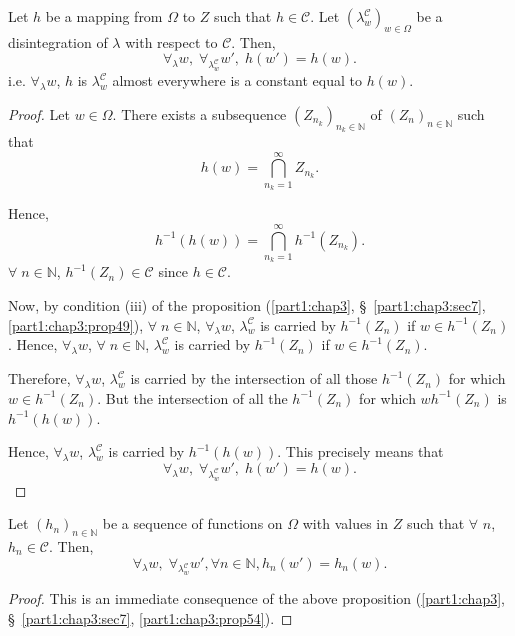 \begin{proposition}\label{part1:chap3:prop54}
Let $h$ be a mapping from $\Omega$ to $Z$ such that $h \in
\mathscr{C}$. Let $(\lambda^\mathscr{C}_w)_{w \in \Omega}$ be a
disintegration of $\lambda$ with respect to $\mathscr{C}$. Then, 
$$
\forall_\lambda w, \; \forall_{\lambda^\mathscr{C}_w} w', \; h(w') = h (w).
$$\pageoriginale
i.e. $\forall_\lambda w$, $h$ is $\lambda^\mathscr{C}_w$ almost
everywhere is a constant equal to $h(w)$. 
\end{proposition}

\begin{proof}
Let $w \in \Omega$. There exists a subsequence $(Z_{n_k})_{n_k \in
  \mathbb{N}}$ of $(Z_n)_{n \in \mathbb{N}}$ such that 
$$
h(w) = \bigcap\limits^{\infty}_{n_k =1} Z_{n_k}. 
$$

Hence, 
$$
h^{-1} (h(w)) = \bigcap\limits^{\infty}_{n_k =1} h^{-1}(Z_{n_k}). 
$$
$\forall \; n \in \mathbb{N}$, $h^{-1}(Z_n) \in \mathscr{C}$ since $h
\in \mathscr{C}$. 

Now, by condition (iii) of the proposition (\ref{part1:chap3},
\S\ \ref{part1:chap3:sec7}, \ref{part1:chap3:prop49}), $\forall 
\; n \in \mathbb{N} $, $\forall_\lambda w$, $\lambda^\mathscr{C}_w$ is
carried by $h^{-1}(Z_n)$ if $w \in h^{-1} (Z_n)$. Hence,
$\forall_\lambda w$, $\forall \; n \in \mathbb{N}$,
$\lambda^\mathscr{C}_w$ is carried by $h^{-1}(Z_n)$ if $w \in
h^{-1}(Z_n)$. 

Therefore, $\forall_\lambda w$, $\lambda^\mathscr{C}_w$ is carried by
the intersection of all those $h^{-1}(Z_n)$ for which $w \in
h^{-1}(Z_n)$. But the intersection of all the $h^{-1}(Z_n)$ for which
$w h^{-1} (Z_n)$ is $h^{-1}(h(w))$. 

Hence, $\forall_\lambda w$, $\lambda^\mathscr{C}_w$ is carried by
$h^{-1}(h(w))$. This precisely means that 
$$
\forall_\lambda w, \; \forall_{\lambda^\mathscr{C}_w}  w', \; h(w') =
h(w). 
$$
\end{proof}

\begin{corollary}\label{part1:chap3:coro55}
Let $(h_n)_{n \in\mathbb{N}}$ be a sequence of functions on $\Omega$
with values in $Z$ such that $\forall$ $n$, $h_n \in
\mathscr{C}$. Then, 
$$
\forall_\lambda w, \; \forall_{\lambda^\mathscr{C}_w} w', \forall n\in
\mathbb{N}, h_n(w')= h_n(w). 
$$
\end{corollary}

\begin{proof}
This is an immediate consequence of the above proposition
(\ref{part1:chap3}, \S\ \ref{part1:chap3:sec7}, \ref{part1:chap3:prop54}). 
\end{proof}


